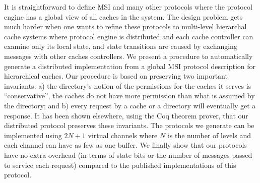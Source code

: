


It is straightforward to define MSI and many other protocols where the protocol
engine has a global view of all caches in the system.  The design problem gets
much harder when one wants to refine these protocols to multi-level hierarchal
cache systems where protocol engine is distributed and each cache controller
can examine only its local state, and state transitions are caused by
exchanging messages with other caches controllers. We present a procedure to
automatically generate a distributed implementation from a global MSI protocol
description for hierarchical caches.  Our procedure is based on preserving two
important invariants: a) the directory's notion of the permissions for the
caches it serves is ``conservative'', \ie the caches do not have more
permission than what is assumed by the directory; and b) every request by a
cache or a directory will eventually get a response. It has been shown
elsewhere, using the Coq theorem prover, that our distributed protocol
preserves these invariants.  The protocols we generate can be implemented using
$2N + 1$ virtual channels where $N$ is the number of levels and each channel
can have as few as one buffer. We finally show that our protocols have no extra
overhead (in terms of state bits or the number of messages passed to service
each request) compared to the published implementations of this protocol. 
 


